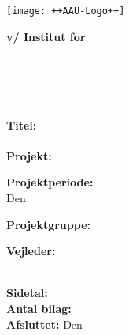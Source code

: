 

\cleardoublepage
{}
{}
\thispagestyle{empty}

\begin{minipage}[t]{0.48\textwidth}
\vspace*{-25pt}
\texttt{[image: ++AAU-Logo++]}
\end{minipage}
\hfill
\begin{minipage}[t]{0.48\textwidth}
{\small 
\textbf{v/ Institut for\\
\institutionname}\\
\studyname\\
\adress\\
\city\\
}
\end{minipage}
%
\vspace*{1cm}
%
\begin{minipage}[t]{0.48\textwidth}
\textbf{Titel:} \\[5pt]\bigskip\hspace{2ex}
\projectname\vspace{-2.75ex}\bigskip\hspace{2ex}
\projectnameextension\\

%
\textbf{Projekt:} \\[5pt]\bigskip\hspace{2ex}
\semestername

\textbf{Projektperiode:} \\[5pt]\bigskip\hspace{2ex}
Den \projectperiod

\textbf{Projektgruppe:} \\[5pt]\bigskip\hspace{2ex}
\groupname


\textbf{Vejleder:} \\[5pt]\hspace*{2ex}
\supervisor \\\hspace*{2ex}

\textbf{Sidetal:} \numberofpages \\ %
\textbf{Antal bilag:} \numberofappendix \\ %
\textbf{Afsluttet:} Den \finishdate\ \finishyear
\end{minipage}
